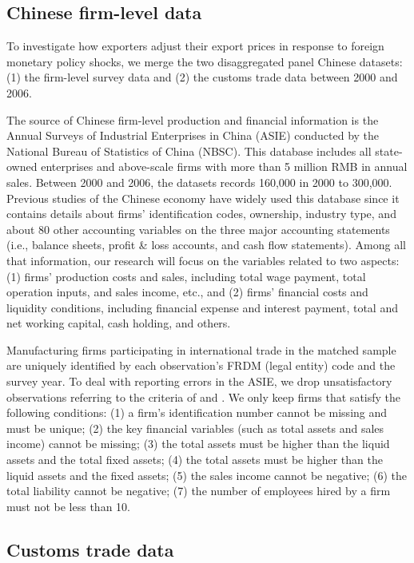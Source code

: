\subsection{Chinese firm-level data}

To investigate how exporters adjust their export prices in response to foreign monetary policy shocks, we merge the two disaggregated panel Chinese datasets: (1) the firm-level survey data and (2) the customs trade data between 2000 and 2006.

The source of Chinese firm-level production and financial information is the Annual Surveys of Industrial Enterprises in China (ASIE) conducted by the National Bureau of Statistics of China (NBSC). This database includes all state-owned enterprises and above-scale firms with more than 5 million RMB in annual sales. Between 2000 and 2006, the datasets records 160,000 in 2000 to 300,000. Previous studies of the Chinese economy have widely used this database since it contains details about firms’ identification codes, ownership, industry type, and about 80 other accounting variables on the three major accounting statements (i.e., balance sheets, profit \& loss accounts, and cash flow statements). Among all that information, our research will focus on the variables related to two aspects: (1) firms' production costs and sales, including total wage payment, total operation inputs, and sales income, etc., and (2) firms' financial costs and liquidity conditions, including financial expense and interest payment, total and net working capital, cash holding, and others.

Manufacturing firms participating in international trade in the matched sample are uniquely identified by each observation's FRDM (legal entity) code and the survey year. To deal with reporting errors in the ASIE, we drop unsatisfactory observations referring to the criteria of \cite{fan2015credit} and \cite{brooks2021agglomeration}. We only keep firms that satisfy the following conditions: (1) a firm’s identification number cannot be missing and must be unique; (2) the key financial variables (such as total assets and sales income) cannot be missing;  (3) the total assets must be higher than the liquid assets and the total fixed assets; (4) the total assets must be higher than the liquid assets and the fixed assets; (5) the sales income cannot be negative; (6) the total liability cannot be negative; (7) the number of employees hired by a firm must not be less than 10.

\subsection{Customs trade data}

